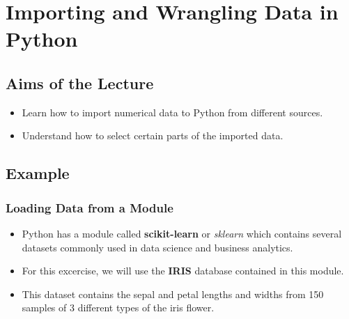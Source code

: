 \documentclass[11pt]{article}
\providecommand{\tightlist}{%
      \setlength{\itemsep}{0pt}\setlength{\parskip}{0pt}}
\begin{document}
    \hypertarget{importing-and-wrangling-data-in-python}{%
\section{Importing and Wrangling Data in
Python}\label{importing-and-wrangling-data-in-python}}

    \hypertarget{aims-of-the-lecture}{%
\subsection{Aims of the Lecture}\label{aims-of-the-lecture}}

\begin{itemize}
\tightlist
\item
  Learn how to import numerical data to Python from different sources.
\item
  Understand how to select certain parts of the imported data.
\end{itemize}

    \hypertarget{example}{%
\subsection{Example}\label{example}}

    \hypertarget{loading-data-from-a-module}{%
\subsubsection{Loading Data from a
Module}\label{loading-data-from-a-module}}

    \begin{itemize}
\tightlist
\item
  Python has a module called \textbf{scikit-learn} or \emph{sklearn}
  which contains several datasets commonly used in data science and
  business analytics.
\end{itemize}

    \begin{itemize}
\tightlist
\item
  For this excercise, we will use the \textbf{IRIS} database contained
  in this module.
\end{itemize}

    \begin{itemize}
\tightlist
\item
  This dataset contains the sepal and petal lengths and widths from 150
  samples of 3 different types of the iris flower.
\end{itemize}
\end{document}
